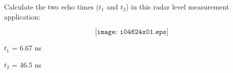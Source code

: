 

Calculate the two echo times ($t_1$ and $t_2$) in this radar level measurement application:

$$\texttt{[image: i04624x01.eps]}$$







$t_1$ = 6.67 ns

\vskip 10pt

$t_2$ = 46.5 ns











